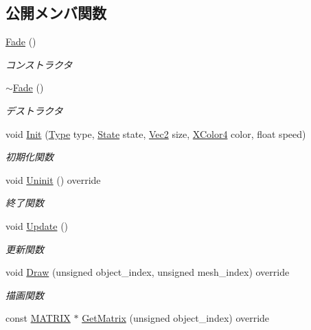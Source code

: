 \subsection*{公開メンバ関数}
\begin{DoxyCompactItemize}
\item 
\mbox{\hyperlink{class_fade_aec1ac5a0a80be8d7a2a43dbde2a741ee}{Fade}} ()
\begin{DoxyCompactList}\small\item\em コンストラクタ \end{DoxyCompactList}\item 
\mbox{\hyperlink{class_fade_a58ddf7585cb85bf84f5e83adbe2734f9}{$\sim$\+Fade}} ()
\begin{DoxyCompactList}\small\item\em デストラクタ \end{DoxyCompactList}\item 
void \mbox{\hyperlink{class_fade_aab12848f7102a219968c86ed699a6e5d}{Init}} (\mbox{\hyperlink{class_fade_ac06f27215b454aa05b93c236476d6e80}{Type}} type, \mbox{\hyperlink{class_fade_ae77826bf3ff2ab95fb7b3b6f95cba80a}{State}} state, \mbox{\hyperlink{_vector3_d_8h_a5ef6e95dfc5f9d3820b71772d99bbc25}{Vec2}} size, \mbox{\hyperlink{_vector3_d_8h_a680c30c4a07d86fe763c7e01169cd6cc}{X\+Color4}} color, float speed)
\begin{DoxyCompactList}\small\item\em 初期化関数 \end{DoxyCompactList}\item 
void \mbox{\hyperlink{class_fade_ae77d06811869d3c8162a42c3e0e14f7f}{Uninit}} () override
\begin{DoxyCompactList}\small\item\em 終了関数 \end{DoxyCompactList}\item 
void \mbox{\hyperlink{class_fade_a1579b5b9020344a1131ea11c15f2c0bd}{Update}} ()
\begin{DoxyCompactList}\small\item\em 更新関数 \end{DoxyCompactList}\item 
void \mbox{\hyperlink{class_fade_a84a9e688650ac500e03cde74ff0210b8}{Draw}} (unsigned object\+\_\+index, unsigned mesh\+\_\+index) override
\begin{DoxyCompactList}\small\item\em 描画関数 \end{DoxyCompactList}\item 
const \mbox{\hyperlink{_vector3_d_8h_a032295cd9fb1b711757c90667278e744}{M\+A\+T\+R\+IX}} $\ast$ \mbox{\hyperlink{class_fade_a6aed6912ebf9c243c52cb82f298d8d64}{Get\+Matrix}} (unsigned object\+\_\+index) override

\end{DoxyCompactItemize}
